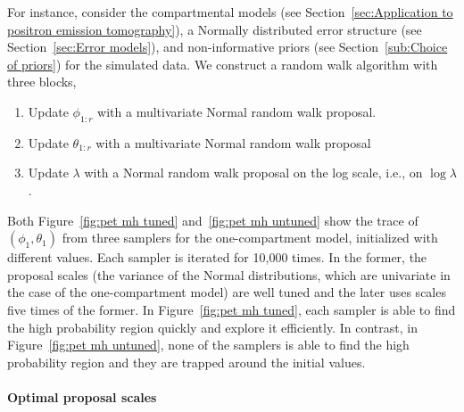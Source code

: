 For instance, consider the \pet compartmental models (see
Section~\ref{sec:Application to positron emission tomography}), a Normally
distributed error structure (see Section~\ref{sec:Error models}), and
non-informative priors (see Section~\ref{sub:Choice of priors}) for the
simulated data. We construct a random walk algorithm with three blocks,
\begin{enumerate}
  \item Update $\phi_{1:r}$ with a multivariate Normal random walk proposal.
  \item Update $\theta_{1:r}$ with a multivariate Normal random walk proposal
  \item Update $\lambda$ with a Normal random walk proposal on the log scale,
    i.e., on $\log\lambda$.
\end{enumerate}
Both Figure~\ref{fig:pet mh tuned} and~\ref{fig:pet mh untuned} show the
trace of $(\phi_1, \theta_1)$ from three samplers for the one-compartment
model, initialized with different values. Each sampler is iterated for 10,000
times. In the former, the proposal scales (the variance of the Normal
distributions, which are univariate in the case of the one-compartment model)
are well tuned and the later uses scales five times of the former. In
Figure~\ref{fig:pet mh tuned}, each sampler is able to find the high
probability region quickly and explore it efficiently. In contrast, in
Figure~\ref{fig:pet mh untuned}, none of the samplers is able to find the
high probability region and they are trapped around the initial values.




\paragraph{Optimal proposal scales}

